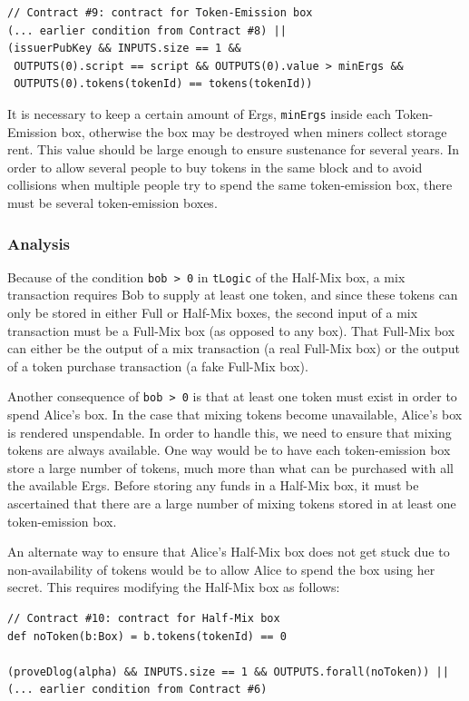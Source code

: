\documentclass[11pt]{article}
\begin{document}
{\small
\begin{Verbatim}[frame=single]
// Contract #9: contract for Token-Emission box
(... earlier condition from Contract #8) || 
(issuerPubKey && INPUTS.size == 1 && 
 OUTPUTS(0).script == script && OUTPUTS(0).value > minErgs &&
 OUTPUTS(0).tokens(tokenId) == tokens(tokenId))
\end{Verbatim}
}
It is necessary to keep a certain amount of Ergs, \texttt{minErgs} inside each Token-Emission box, otherwise the box may be destroyed when miners collect storage rent. This value should be large enough to ensure sustenance for several years. 
In order to allow several people to buy tokens in the same block and to avoid collisions when multiple people try to spend the same token-emission box, there must be several token-emission boxes. 

\subsubsection{Analysis}

Because of the condition \texttt{bob > 0} in \texttt{tLogic} of the Half-Mix box, a mix transaction requires Bob to supply at least one token, and since these tokens can only be stored in either Full or Half-Mix boxes, the second input of a mix transaction must be a Full-Mix box (as opposed to any box).
That Full-Mix box can either be the output of a mix transaction (a real Full-Mix box) or the output of a token purchase transaction (a fake Full-Mix box).

Another consequence of \texttt{bob > 0} is that at least one token must exist in order to spend Alice's box. In the case that mixing tokens become unavailable, Alice's box is rendered unspendable. In order to handle this, we need to ensure that mixing tokens are always available. One way would be to have each token-emission box store a large number of tokens, much more than what can be purchased with all the available Ergs. Before storing any funds in a Half-Mix box, it must be ascertained that there are a large number of mixing tokens stored in at least one token-emission box. 

An alternate way to ensure that Alice's Half-Mix box does not get stuck due to non-availability of tokens would be to allow Alice to spend the box using her secret. This requires modifying the Half-Mix box as follows:

{\small
\begin{Verbatim}[frame=single]
// Contract #10: contract for Half-Mix box
def noToken(b:Box) = b.tokens(tokenId) == 0

(proveDlog(alpha) && INPUTS.size == 1 && OUTPUTS.forall(noToken)) || 
(... earlier condition from Contract #6)
\end{Verbatim}
}
\end{document}
